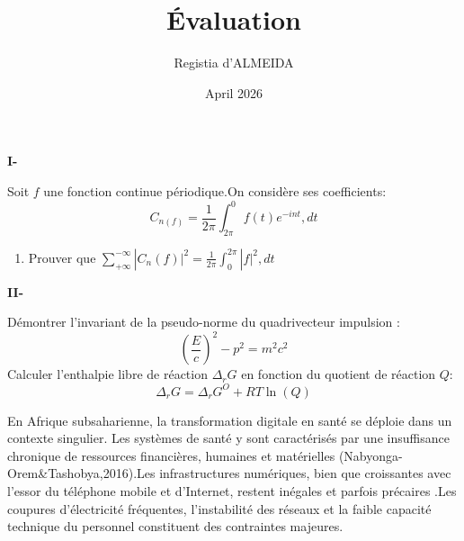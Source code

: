 
\title{Évaluation}
\author{Registia d'ALMEIDA}
\date{April 2026}





\begin{center}
\vspace{1cm}
    \textbf{I-}
\end{center}

\begin{center}
Soit $f$ une fonction continue périodique.On considère ses coefficients:
$$C_{n(f)}=\frac{1}{2\pi}\int_{2\pi}^{0} f(t)e^{-int},dt $$
\begin{enumerate}
    \item Prouver que 
    $\sum_{+\infty}^{-\infty}|C_{n}(f)\vert^{2}=\frac{1}{2\pi}\int_{0}^{2\pi}|f\rvert^{2},dt$
\end{enumerate}
\vspace{1cm}
\textbf{II-}
\begin{center}


\end{center}
Démontrer l'invariant de la pseudo-norme du quadrivecteur impulsion :
$$(\frac{E}{c})^{2}-p^{2}=m^{2}c^{2}$$
\vspace{1cm}
Calculer l'enthalpie libre de réaction $\Delta_{r}G$ en fonction du quotient de réaction $Q$:
$$\Delta_{r}G=\Delta_{r}G^{O}+RT\ln(Q)$$

\begin{minipage}{0.875\linewidth}
En Afrique subsaharienne, la transformation digitale en santé se déploie dans un contexte singulier. Les systèmes de santé y  sont caractérisés par une insuffisance chronique de ressources financières, humaines et matérielles (Nabyonga- Orem\&Tashobya,2016).Les infrastructures numériques, bien que croissantes avec l'essor du téléphone mobile et d'Internet, restent inégales et parfois précaires .Les coupures d'électricité fréquentes, l'instabilité des réseaux et la faible capacité technique du personnel constituent des contraintes majeures.
\end{minipage}
\end{center}

